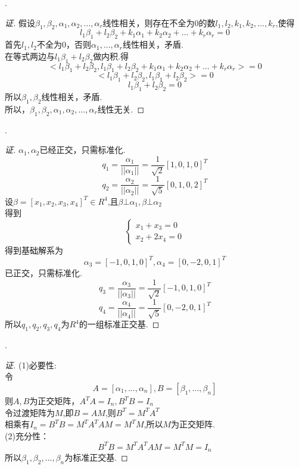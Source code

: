 \documentclass[10pt,a4paper]{report}
\begin{document}
.
\begin{proof}[证]
	假设$\beta_{1},\beta_{2},\alpha_{1},\alpha_{2},...,\alpha_{r}$线性相关，则存在不全为$0$的数$l_{1},l_{2},k_{1},k_{2},...,k_{r}$,使得\\
	$$l_{1}\beta_{1} + l_{2}\beta_{2} + k_{1}\alpha_{1}+k_{2}\alpha_{2}+...+k_{r}\alpha_{r} = 0$$
	首先$l_{1},l_{2}$不全为0，否则$\alpha_{1},...,\alpha_{r}$线性相关，矛盾.\\
	在等式两边与$l_{1}\beta_{1}+l_{2}\beta_{2}$做内积.得
	$$<l_{1}\beta_{1}+l_{2}\beta_{2}, l_{1}\beta_{1} + l_{2}\beta_{2} + k_{1}\alpha_{1}+k_{2}\alpha_{2}+...+k_{r}\alpha_{r}> = 0$$
	$$<l_{1}\beta_{1}+l_{2}\beta_{2},l_{1}\beta_{1}+l_{2}\beta_{2}> = 0$$
	$$l_{1}\beta_{1}+l_{2}\beta_{2} = 0$$
	所以$\beta_{1},\beta_{2}$线性相关，矛盾.\\
	所以，$\beta_{1},\beta_{2},\alpha_{1},\alpha_{2},...,\alpha_{r}$线性无关.
\end{proof}
.
\begin{proof}[证]
	$\alpha_{1},\alpha_{2}$已经正交，只需标准化.\\
	$$q_{1} = \frac{\alpha_{1}}{||\alpha_{1}||} = \frac{1}{\sqrt{2}}[1,0,1,0]^{T}$$
	$$q_{2} = \frac{\alpha_{2}}{||\alpha_{2}||} = \frac{1}{\sqrt{5}}[0,1,0,2]^{T}$$
	设$\beta = [x_{1},x_{2},x_{3},x_{4}]^{T} \in R^{4}$,且$\beta \bot \alpha_{1}, \beta \bot \alpha_{2}$\\
	得到
	$$
	\left\{
	\begin{aligned}
	x_{1}+x_{3} = 0\\
	x_{2}+2x_{4} = 0
	\end{aligned}
	\right.
	$$
	得到基础解系为
	$$
	\alpha_{3} = [-1,0,1,0]^{T}, \alpha_{4} = [0,-2,0,1]^{T}
	$$
	已正交，只需标准化.
	$$q_{3} = \frac{\alpha_{3}}{||\alpha_{3}||} = \frac{1}{\sqrt{2}}[-1,0,1,0]^{T}$$
	$$q_{4} = \frac{\alpha_{4}}{||\alpha_{4}||} = \frac{1}{\sqrt{5}}[0,-2,0,1]^{T}$$
	所以$q_{1},q_{2},q_{3},q_{4}$为$R^{4}$的一组标准正交基.
\end{proof}
.
\begin{proof}[证]
	(1)必要性:\\
	令
	$$A = [\alpha_{1}, ..., \alpha_{n}], B = [\beta_{1},...,\beta_{n}]$$
	则$A,B$为正交矩阵，$A^{T}A = I_{n}, B^{T}B = I_{n}$\\
	令过渡矩阵为$M$,即$B=AM$,则$B^{T} = M^{T}A^{T}$\\
	相乘有$I_{n} = B^{T}B=M^{T}A^{T}AM = M^{T}M$,所以$M$为正交矩阵.\\
	(2)充分性：\\
	$$B^{T}B = M^{T}A^{T}AM = M^{T}M = I_{n}$$
	所以$\beta_{1},\beta_{2},...,\beta_{n}$为标准正交基.
\end{proof}
\end{document}
